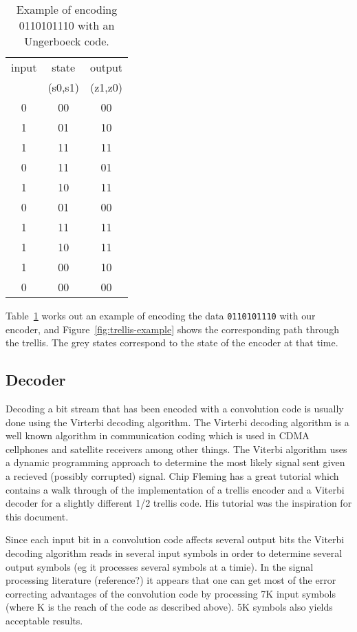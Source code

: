 \begin{table}
\center
\begin{tabular}{c|c|c}
input & state   & output  \\
      & (s0,s1) & (z1,z0) \\
\hline
0 & 00 & 00 \\
1 & 01 & 10 \\
1 & 11 & 11 \\
0 & 11 & 01 \\
1 & 10 & 11 \\
0 & 01 & 00 \\
1 & 11 & 11 \\
1 & 10 & 11 \\
1 & 00 & 10 \\
0 & 00 & 00 \\
\end{tabular}
\caption{Example of encoding 0110101110 with an Ungerboeck code.}
\label{tbl:ungerboeck_example}
\end{table}

Table~\ref{tbl:ungerboeck_example} works out an example of encoding 
the data \texttt{0110101110} with our encoder,
and Figure~\ref{fig:trellis-example} shows the corresponding path through
the trellis. The grey states correspond to the state of the encoder 
at that time. 

\subsection{Decoder}

Decoding a bit stream that has been encoded with a convolution code is usually
done using the Virterbi decoding algorithm. The Virterbi decoding algorithm
is a well known algorithm in communication coding which is used in CDMA cellphones
and satellite receivers among other things. The Viterbi algorithm uses a dynamic programming
approach to determine the most likely signal sent given a recieved (possibly corrupted) signal. 
Chip Fleming has a great tutorial\cite{fleming:tutorial} which contains a walk 
through of the implementation of a trellis encoder and a Viterbi decoder 
for a slightly different 1/2 trellis code. His tutorial was the inspiration for this document.

Since each input bit in a convolution code affects several output bits
the Viterbi decoding algorithm reads in several input symbols in order to determine
several output symbols (eg it processes several symbols at a timie). In the
signal processing literature (reference?) it appears that one can get most
of the error correcting advantages of the convolution code by processing 7K input symbols
(where K is the reach of the code as described above). 5K symbols also yields
acceptable results.

